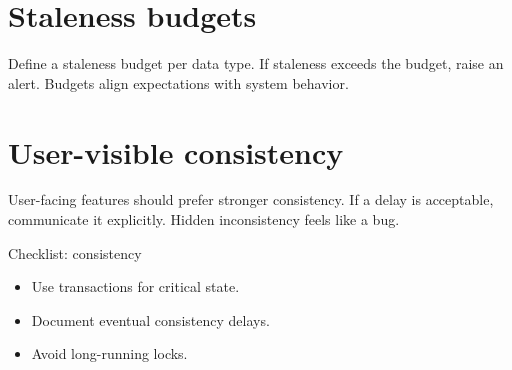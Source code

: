\section{Staleness budgets}
Define a staleness budget per data type.
If staleness exceeds the budget, raise an alert.
Budgets align expectations with system behavior.

\section{User-visible consistency}
User-facing features should prefer stronger consistency.
If a delay is acceptable, communicate it explicitly.
Hidden inconsistency feels like a bug.

\begin{checklistbox}{Checklist: consistency}
\begin{itemize}[nosep]
  \item Use transactions for critical state.
  \item Document eventual consistency delays.
  \item Avoid long-running locks.
\end{itemize}
\end{checklistbox}
